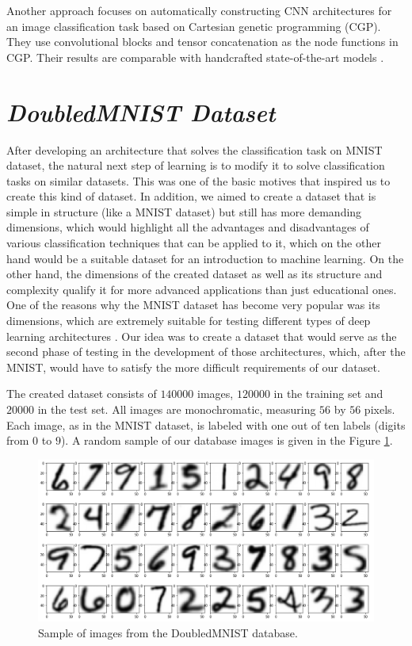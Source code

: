 \documentclass[eng]{simposium}
\begin{document}
Another approach focuses on automatically constructing CNN architectures for an image classification task based on Cartesian genetic programming (CGP). 
They use convolutional blocks and tensor concatenation as the node functions in CGP. Their results are comparable with handcrafted state-of-the-art models \cite{5}. 

\section{\textit{DoubledMNIST Dataset}} 

After developing an architecture that solves the classification task on MNIST dataset, the natural next step of learning is  
to modify it to solve classification tasks on similar datasets.  
This was one of the basic motives that inspired us to create this kind of dataset.  
In addition, we aimed to create a dataset that is simple in structure (like a MNIST dataset) but still has more demanding  
dimensions, which would highlight all the advantages and disadvantages of various classification techniques that can be  
applied to it, which on the other hand would be a suitable dataset for an introduction to machine learning.  
On the other hand, the dimensions of the created dataset as well as its structure and complexity qualify it for more  
advanced applications than just educational ones.  
One of the reasons why the MNIST dataset has become very popular was its dimensions, which are extremely suitable for  
testing different types of deep learning architectures \cite{27}.  
Our idea was to create a dataset that would serve as the second phase of testing in the development of those architectures,  
which, after the MNIST, would have to satisfy the more difficult requirements of our dataset.  

The created dataset consists of $140000$ images, $120000$ in the training set and $20000$ in the test set.  
All images are monochromatic, measuring $56$ by $56$ pixels.  
Each image, as in the MNIST dataset, is labeled with one out of ten labels (digits from $0$ to $9$).  
A random sample of our database images is given in the Figure \ref{fig:nist_sample}.  

\begin{figure}[!ht] 
  \centering 
  \includegraphics[width=1\textwidth]{sample_from_nist.png} 
  \caption{Sample of images from the DoubledMNIST database.} 
  \label{fig:nist_sample} 
\end{figure} 
\end{document}
